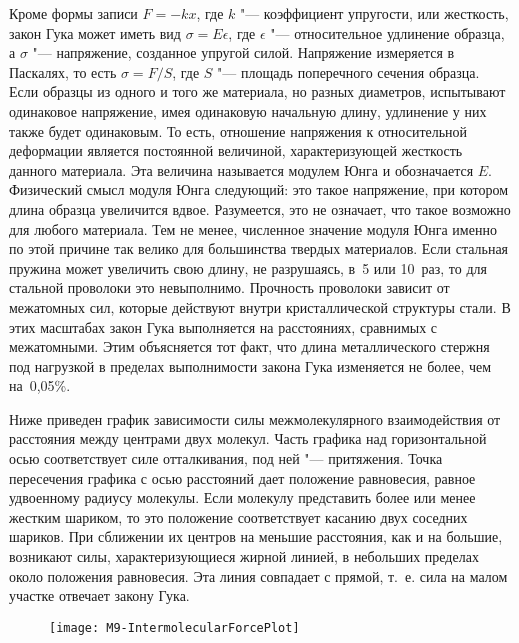 \documentclass[a4paper, 12pt]{extarticle}
\newcommand{\eps}{\epsilon}
\begin{document}
Кроме формы записи $F = - kx$, где $k$ "--- коэффициент упругости, или жесткость, закон Гука может иметь вид $\sigma = E \eps$, где $\eps$ "--- относительное удлинение образца, а $\sigma$ "--- напряжение, созданное упругой силой. Напряжение измеряется в Паскалях, то есть $\sigma = F/S$, где $S$ "--- площадь поперечного сечения образца. Если образцы из одного и того же материала, но разных диаметров, испытывают одинаковое напряжение, имея одинаковую начальную длину, удлинение у них также будет одинаковым. То есть, отношение напряжения к относительной деформации является постоянной величиной, характеризующей жесткость данного материала. Эта величина называется модулем Юнга и обозначается $E$. Физический смысл модуля Юнга следующий: это такое напряжение, при котором длина образца  увеличится вдвое. Разумеется, это не означает, что такое возможно для любого материала. Тем не менее, численное значение модуля Юнга именно по этой причине так велико для большинства твердых материалов. Если стальная пружина может увеличить свою длину, не разрушаясь, в~5 или 10~раз, то для стальной проволоки это невыполнимо. Прочность проволоки зависит от межатомных сил, которые действуют внутри кристаллической структуры стали. В этих масштабах закон Гука выполняется на расстояниях, сравнимых с межатомными. Этим объясняется тот факт, что длина металлического стержня под нагрузкой в пределах выполнимости закона Гука изменяется не более, чем на~0,05\%.

Ниже приведен график зависимости силы межмолекулярного взаимодействия от расстояния между центрами двух молекул. Часть графика над горизонтальной осью соответствует силе отталкивания, под ней "--- притяжения. Точка пересечения графика с осью расстояний дает положение равновесия, равное удвоенному радиусу молекулы. Если молекулу представить более или менее жестким шариком, то это положение соответствует касанию двух соседних шариков. При сближении их центров на меньшие расстояния, как и на большие, возникают силы, характеризующиеся жирной линией, в небольших пределах около положения равновесия. Эта линия совпадает с прямой, т.~е. сила на малом участке отвечает закону Гука. %

\begin{figure}[h]
\begin{center}
\texttt{[image: M9-IntermolecularForcePlot]}
\end{center}
\caption{\label{fig:m9b-plot}}
\end{figure}
\end{document}

